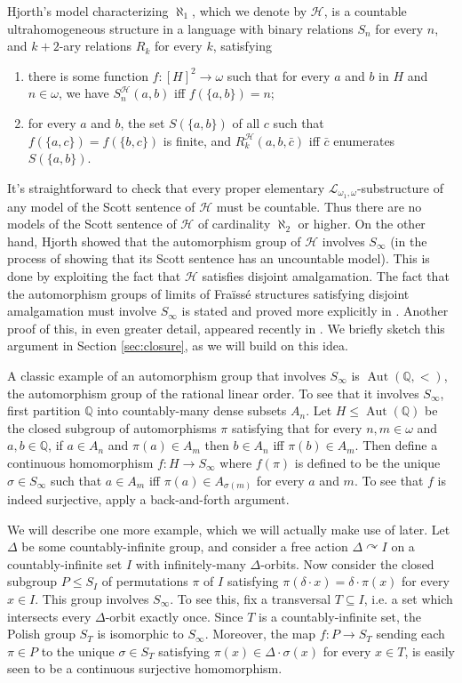 \documentclass[12pt]{amsart}
\theoremstyle{plain}
\theoremstyle{definition}
\newcommand{\mcH}{\mathcal{H}}
\newcommand{\mcL}{\mathcal{L}}
\DeclareMathOperator{\Aut}{Aut}
\begin{document}
Hjorth's model characterizing $\aleph_1$, which we denote by $\mcH$, is a countable ultrahomogeneous structure in a language with binary relations $S_n$ for every $n$, and $k+2$-ary relations $R_k$ for every $k$, satisfying
\begin{enumerate}
    \item there is some function $f : [H]^2 \rightarrow \omega$ such that for every $a$ and $b$ in $H$ and $n \in \omega$, we have $S_n^{\mcH}(a, b)$ iff $f(\{a, b\}) = n$;
    \item for every $a$ and $b$, the set $S(\{a, b\})$ of all $c$ such that $f(\{a, c\}) = f(\{b, c\})$ is finite, and $R_k^{\mcH}(a, b, \bar{c})$ iff $\bar{c}$ enumerates $S(\{a, b\})$.
\end{enumerate}
It's straightforward to check that every proper elementary $\mcL_{\omega_1, \omega}$-substructure of any model of the Scott sentence of $\mcH$ must be countable.
Thus there are no models of the Scott sentence of $\mcH$ of cardinality $\aleph_2$ or higher.
On the other hand, Hjorth showed that the automorphism group of $\mcH$ involves $S_\infty$ (in the process of showing that its Scott sentence has an uncountable model).
This is done by exploiting the fact that $\mcH$ satisfies disjoint amalgamation.
The fact that the automorphism groups of limits of Fra\"{i}ss\'{e} structures satisfying disjoint amalgamation must involve $S_\infty$ is stated and proved more explicitly in \cite{BFKL2016}.
Another proof of this, in even greater detail, appeared recently in \cite{LU2022}.
We briefly sketch this argument in Section \ref{sec:closure}, as we will build on this idea.

A classic example of an automorphism group that involves $S_\infty$ is $\Aut(\mathbb{Q}, <)$, the automorphism group of the rational linear order.
To see that it involves $S_\infty$, first partition $\mathbb{Q}$ into countably-many dense subsets $A_n$.
Let $H \le \Aut(\mathbb{Q})$ be the closed subgroup of automorphisms $\pi$ satisfying that for every $n, m \in \omega$ and $a, b \in \mathbb{Q}$, if $a \in A_n$ and $\pi(a) \in A_m$ then $b \in A_n$ iff $\pi(b) \in A_m$.
Then define a continuous homomorphism $f : H \rightarrow S_\infty$ where $f(\pi)$ is defined to be the unique $\sigma \in S_\infty$ such that $a \in A_m$ iff $\pi(a) \in A_{\sigma(m)}$ for every $a$ and $m$.
To see that $f$ is indeed surjective, apply a back-and-forth argument.

We will describe one more example, which we will actually make use of later.
Let $\Delta$ be some countably-infinite group, and consider a free action $\Delta \curvearrowright I$ on a countably-infinite set $I$ with infinitely-many $\Delta$-orbits.
Now consider the closed subgroup $P \le S_I$ of permutations $\pi$ of $I$ satisfying $\pi(\delta \cdot x) = \delta \cdot \pi(x)$ for every $x \in I$.
This group involves $S_\infty$.
To see this, fix a transversal $T \subseteq I$, i.e. a set which intersects every $\Delta$-orbit exactly once.
Since $T$ is a countably-infinite set, the Polish group $S_T$ is isomorphic to $S_\infty$.
Moreover, the map $f : P \rightarrow S_T$ sending each $\pi \in P$ to the unique $\sigma \in S_T$ satisfying $\pi(x) \in \Delta \cdot \sigma(x)$ for every $x \in T$, is easily seen to be a continuous surjective homomorphism.
\end{document}
